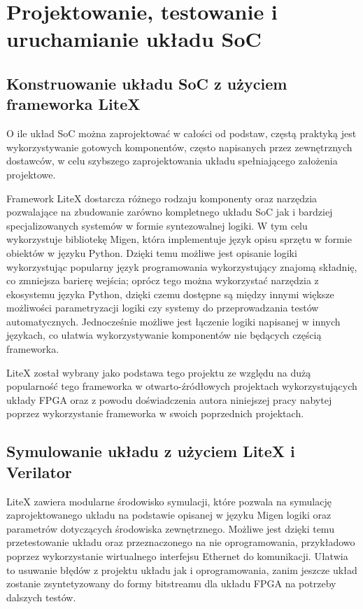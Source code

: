 \section{Projektowanie, testowanie i uruchamianie układu SoC}

\subsection{Konstruowanie układu SoC z użyciem frameworka LiteX}

O ile układ SoC można zaprojektować w całości od podstaw, częstą praktyką jest wykorzystywanie gotowych komponentów, często napisanych przez zewnętrznych dostawców, w celu szybszego zaprojektowania układu spełniającego założenia projektowe.

Framework LiteX\cite{https://doi.org/10.48550/arxiv.2005.02506} dostarcza różnego rodzaju komponenty oraz narzędzia pozwalające na zbudowanie zarówno kompletnego układu SoC jak i bardziej specjalizowanych systemów w formie syntezowalnej logiki. W tym celu wykorzystuje bibliotekę Migen, która implementuje język opisu sprzętu w formie obiektów w języku Python. Dzięki temu możliwe jest opisanie logiki wykorzystując popularny język programowania wykorzystujący znajomą składnię, co zmniejsza barierę wejścia; oprócz tego można wykorzystać narzędzia z ekosystemu języka Python, dzięki czemu dostępne są między innymi większe możliwości parametryzacji logiki czy systemy do przeprowadzania testów automatycznych. Jednocześnie możliwe jest łączenie logiki napisanej w innych językach, co ułatwia wykorzystywanie komponentów nie będących częścią frameworka.


LiteX został wybrany jako podstawa tego projektu ze względu na dużą popularność tego frameworka w otwarto-źródłowych projektach wykorzystujących układy FPGA oraz z powodu doświadczenia autora niniejszej pracy nabytej poprzez wykorzystanie frameworka w swoich poprzednich projektach.

\subsection{Symulowanie układu z użyciem LiteX i Verilator}

LiteX zawiera modularne środowisko symulacji, które pozwala na symulację zaprojektowanego układu na podstawie opisanej w języku Migen logiki oraz parametrów dotyczących środowiska zewnętrznego. Możliwe jest dzięki temu przetestowanie układu oraz przeznaczonego na nie oprogramowania, przykładowo poprzez wykorzystanie wirtualnego interfejsu Ethernet do komunikacji. Ułatwia to usuwanie błędów z projektu układu jak i oprogramowania, zanim jeszcze układ zostanie zsyntetyzowany do formy bitstreamu dla układu FPGA na potrzeby dalszych testów.

